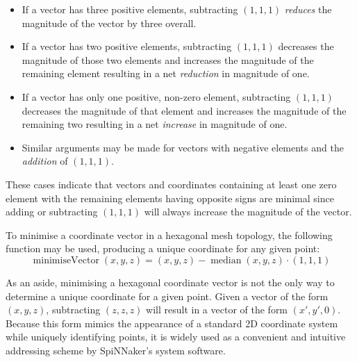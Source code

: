 	\begin{itemize}
	
		\item If a vector has three positive elements, subtracting $(1,1,1)$
		\emph{reduces} the magnitude of the vector by three overall.
		
		\item If a vector has two positive elements, subtracting $(1,1,1)$
		decreases the magnitude of those two elements and increases the magnitude
		of the remaining element resulting in a net \emph{reduction} in magnitude
		of one.
		
		\item If a vector has only one positive, non-zero element, subtracting
		$(1,1,1)$ decreases the magnitude of that element and increases the
		magnitude of the remaining two resulting in a net \emph{increase} in
		magnitude of one.
		
		\item Similar arguments may be made for vectors with negative elements and
		the \emph{addition} of $(1,1,1)$.
	
	\end{itemize}
	
	These cases indicate that vectors and coordinates containing at least one
	zero element with the remaining elements having opposite signs are minimal
	since adding or subtracting $(1,1,1)$ will always increase the magnitude of
	the vector.
	
	To minimise a coordinate vector in a hexagonal mesh topology, the following
	function may be used, producing a unique coordinate for any given point:
	\begin{equation*}
		\operatorname{minimiseVector}(x,y,z) =
			(x,y,z) - \operatorname{median}(x,y,z) \cdot (1,1,1)
	\end{equation*}
	
	As an aside, minimising a hexagonal coordinate vector is not the only way to
	determine a unique coordinate for a given point. Given a vector of the form
	$(x, y, z)$, subtracting $(z,z,z)$ will result in a vector of the form $(x',
	y', 0)$. Because this form mimics the appearance of a standard 2D coordinate
	system while uniquely identifying points, it is widely used as a convenient
	and intuitive addressing scheme by SpiNNaker's system software.
